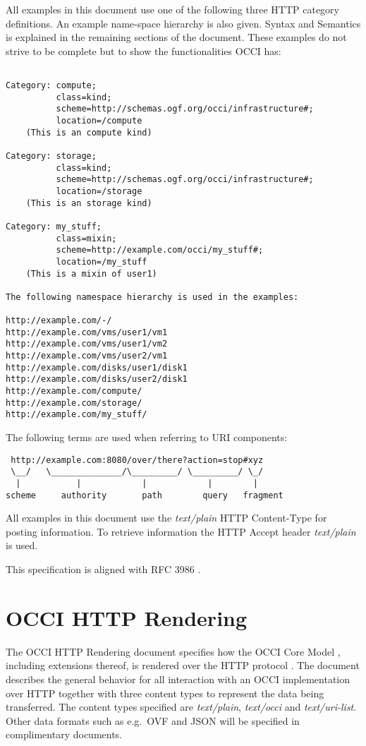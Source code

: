 \documentclass[10pt,a4paper]{article}
\begin{document}
All examples in this document use one of the following three HTTP
category definitions. An example name-space hierarchy is also
given. Syntax and Semantics is explained in the remaining sections of
the document. These examples do not strive to be complete but to show
the functionalities OCCI has:

\begin{verbatim}

Category: compute;
          class=kind;
          scheme=http://schemas.ogf.org/occi/infrastructure#;
          location=/compute 
    (This is an compute kind)

Category: storage;
          class=kind;
          scheme=http://schemas.ogf.org/occi/infrastructure#;
          location=/storage 
    (This is an storage kind)

Category: my_stuff;
          class=mixin;
          scheme=http://example.com/occi/my_stuff#;
          location=/my_stuff 
    (This is a mixin of user1)

The following namespace hierarchy is used in the examples:

http://example.com/-/
http://example.com/vms/user1/vm1
http://example.com/vms/user1/vm2
http://example.com/vms/user2/vm1
http://example.com/disks/user1/disk1
http://example.com/disks/user2/disk1
http://example.com/compute/
http://example.com/storage/
http://example.com/my_stuff/
\end{verbatim}

The following terms \cite{rfc3986} are used when referring to URI components:

\begin{verbatim}
 http://example.com:8080/over/there?action=stop#xyz
 \__/   \______________/\_________/ \_________/ \_/
  |           |            |            |        |
scheme     authority       path        query   fragment
\end{verbatim}

All examples in this document use the \emph{text/plain} HTTP
Content-Type for posting information. To retrieve information the HTTP
Accept header \emph{text/plain} is used.

This specification is aligned with RFC 3986 \cite{rfc3986}.

\section{OCCI HTTP Rendering}

The OCCI HTTP Rendering document specifies how the OCCI Core Model
\cite{occi:core}, including extensions thereof, is rendered over the HTTP
protocol \cite{rfc2616}. The document describes the general behavior for all
interaction with an OCCI implementation over HTTP together with three content
types to represent the data being transferred. The content types specified are
\textit{text/plain}, \textit{text/occi} and \textit{text/uri-list}. Other
data formats such as e.g.~OVF and JSON will be specified in complimentary
documents.
\end{document}
